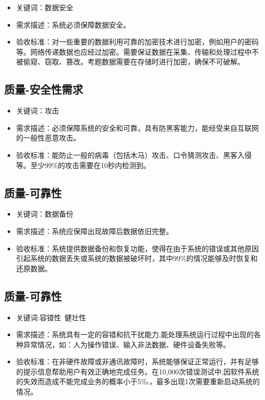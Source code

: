 \documentclass[hyperref, a4paper]{ctexart}
\providecommand{\tightlist}{%
  \setlength{\itemsep}{0pt}\setlength{\parskip}{0pt}}
\begin{document}
\begin{itemize}
\tightlist
\item
  关键词：数据安全
\item
  需求描述：系统必须保障数据安全。
\item
  验收标准：对一些重要的数据利用可靠的加密技术进行加密，例如用户的密码等。网络传递数据也应经过加密。需要保证数据在采集、传输和处理过程中不被偷窥、窃取、篡改。考题数据需要在存储时进行加密，确保不可破解。
\end{itemize}

\hypertarget{ux8d28ux91cf-ux5b89ux5168ux6027ux9700ux6c42-3}{%
\subsection{质量-安全性需求}\label{ux8d28ux91cf-ux5b89ux5168ux6027ux9700ux6c42-3}}

\begin{itemize}
\tightlist
\item
  关键词：攻击
\item
  需求描述：必须保障系统的安全和可靠，具有防黑客能力，能经受来自互联网的一般性恶意攻击。
\item
  验收标准：能防止一般的病毒（包括木马）攻击、口令猜测攻击、黑客入侵等。至少99\%的攻击需要在10秒内检测到。
\end{itemize}

\hypertarget{ux8d28ux91cf-ux53efux9760ux6027}{%
\subsection{质量-可靠性}\label{ux8d28ux91cf-ux53efux9760ux6027}}

\begin{itemize}
\tightlist
\item
  关键词：数据备份
\item
  需求描述：系统应保障出现故障后数据依旧完整。
\item
  验收标准：系统提供数据备份和恢复功能，使得在由于系统的错误或其他原因引起系统的数据丢失或系统的数据被破坏时，其中99\%的情况能够及时恢复和还原数据。
\end{itemize}

\hypertarget{ux8d28ux91cf-ux53efux9760ux6027-1}{%
\subsection{质量-可靠性}\label{ux8d28ux91cf-ux53efux9760ux6027-1}}

\begin{itemize}
\tightlist
\item
  关键词:容错性~健壮性
\item
  需求描述：系统具有一定的容错和抗干扰能力,能处理系统运行过程中出现的各种异常情况，如：人为操作错误、输入非法数据、硬件设备失败等。
\item
  验收标准：在非硬件故障或非通讯故障时，系统能够保证正常运行，并有足够的提示信息帮助用户有效正确地完成任务。在10,000次错误测试中,因软件系统的失效而造成不能完成业务的概率小于5‰，最多出现1次需要重新启动系统的情况。
\end{itemize}
\end{document}
